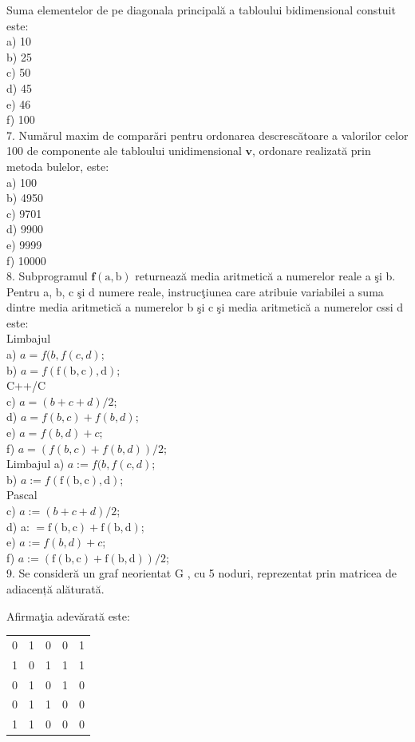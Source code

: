 \documentclass[10pt]{article}
\begin{document}
Suma elementelor de pe diagonala principală a tabloului bidimensional constuit este:\\
a) 10\\
b) 25\\
c) 50\\
d) 45\\
e) 46\\
f) 100\\
7. Numărul maxim de comparări pentru ordonarea descrescătoare a valorilor celor 100 de componente ale tabloului unidimensional $\mathbf{v}$, ordonare realizată prin metoda bulelor, este:\\
a) 100\\
b) 4950\\
c) 9701\\
d) 9900\\
e) 9999\\
f) 10000\\
8. Subprogramul $\mathbf{f}(\mathrm{a}, \mathrm{b})$ returnează media aritmetică a numerelor reale a şi b. Pentru a, b, c şi d numere reale, instrucţiunea care atribuie variabilei a suma dintre media aritmetică a numerelor b şi c şi media aritmetică a numerelor cssi d este:\\
Limbajul\\
a) $a=f(b, f(c, d)$;\\
b) $a=f(\mathrm{f}(\mathrm{b}, \mathrm{c}), \mathrm{d})$;\\
C++/C\\
c) $a=(b+c+d) / 2$;\\
d) $a=f(b, c)+f(b, d)$;\\
e) $a=f(b, d)+c$;\\
f) $a=(f(b, c)+f(b, d)) / 2$;\\
Limbajul a) $a:=f(b, f(c, d)$;\\
b) $a:=f(\mathrm{f}(\mathrm{b}, \mathrm{c}), \mathrm{d})$;\\
Pascal\\
c) $a:=(b+c+d) / 2$;\\
d) a: $=\mathrm{f}(\mathrm{b}, \mathrm{c})+\mathrm{f}(\mathrm{b}, \mathrm{d})$;\\
e) $a:=f(b, d)+c$;\\
f) $a:=(\mathrm{f}(\mathrm{b}, \mathrm{c})+\mathrm{f}(\mathrm{b}, \mathrm{d})) / 2$;\\
9. Se consideră un graf neorientat G , cu 5 noduri, reprezentat prin matricea de adiacență alăturată.

Afirmaţia adevărată este:

\begin{center}
\begin{tabular}{lllll}
0 & 1 & 0 & 0 & 1 \\
1 & 0 & 1 & 1 & 1 \\
0 & 1 & 0 & 1 & 0 \\
0 & 1 & 1 & 0 & 0 \\
1 & 1 & 0 & 0 & 0 \\
\end{tabular}
\end{center}
\end{document}
